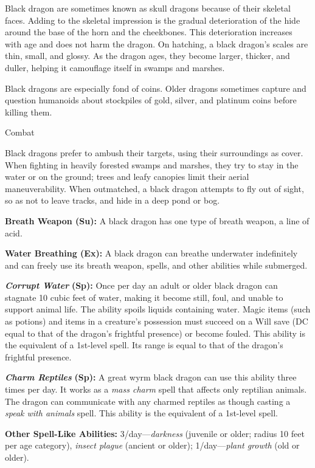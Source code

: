 \documentclass{article}
\begin{document}
Black dragon are sometimes known as skull dragons because of their skeletal faces. 
Adding to the skeletal impression is the gradual deterioration of the hide around 
the base of the horn and the cheekbones. This deterioration increases with age 
and does not harm the dragon. On hatching, a black dragon's scales are thin, small, 
and glossy. As the dragon ages, they become larger, thicker, and duller, helping 
it camouflage itself in swamps and marshes.

Black dragons are especially fond of coins. Older dragons sometimes capture and 
question humanoids about stockpiles of gold, silver, and platinum coins before 
killing them.

Combat

Black dragons prefer to ambush their targets, using their surroundings as cover. 
When fighting in heavily forested swamps and marshes, they try to stay in the water 
or on the ground; trees and leafy canopies limit their aerial maneuverability. 
When outmatched, a black dragon attempts to fly out of sight, so as not to leave 
tracks, and hide in a deep pond or bog.

\textbf{Breath Weapon (Su):} A black dragon has one type of breath weapon, a line 
of acid.

\textbf{Water Breathing (Ex):} A black dragon can breathe underwater indefinitely 
and can freely use its breath weapon, spells, and other abilities while submerged.

\textit{\textbf{Corrupt Water }}\textbf{(Sp):} Once per day an adult or older black 
dragon can stagnate 10 cubic feet of water, making it become still, foul, and unable 
to support animal life. The ability spoils liquids containing water. Magic items 
(such as potions) and items in a creature's possession must succeed on a Will save 
(DC equal to that of the dragon's frightful presence) or become fouled. This ability 
is the equivalent of a 1st-level spell. Its range is equal to that of the dragon's 
frightful presence.

\textit{\textbf{Charm Reptiles }}\textbf{(Sp):} A great wyrm black dragon can use 
this ability three times per day. It works as a \textit{mass charm }spell that 
affects only reptilian animals. The dragon can communicate with any charmed reptiles 
as though casting a \textit{speak with animals }spell. This ability is the equivalent 
of a 1st-level spell.

\textbf{Other Spell-Like Abilities:} 3/day---\textit{darkness }(juvenile or older; 
radius 10 feet per age category), \textit{insect plague }(ancient or older); 1/day---\textit{plant 
growth }(old or older).
\end{document}
